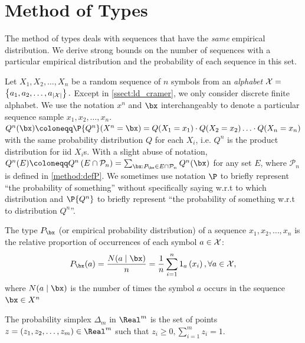 \documentclass{article}
\newcommand{\typss}{\mathcal{P}_n}
\begin{document}
\section{Method of Types}\label{sec:method}
The method of types  deals with sequences that have the \emph{same} empirical distribution.  We derive strong bounds on the number of sequences with a particular empirical distribution and the probability of each sequence in this set. 


Let $X_{1}, X_{2}, \ldots, X_{n}$ be a random sequence of $n$ symbols from an \emph{alphabet} $\cal{X} =$ $\left\{a_{1}, a_{2}, \ldots, a_{|\cal{X}|}\right\} .$ Except in \cref{ssect:ld_cramer}, we only consider discrete finite alphabet. We use the notation $x^{n}$ and $\bx$ interchangeably to denote a particular sequence sample $x_{1}, x_{2}, \ldots, x_{n}$. $Q^n(\bx) \coloneqq \P{Q^n}(X^n = \bx) = Q(X_1 = x_1)\cdot Q(X_2 = x_2)\ldots \cdot Q(X_n = x_n)$ with the same probability distribution $Q$ for each $X_i$, i.e. $Q^n$ is the product distribution for \gls{iid} $X_i$s. With a slight abuse of notation, $Q^{n}(E)\coloneqq Q^{n}\left(E \cap \typss\right)=\sum_{ \bx : P_{ \bx } \in E \cap \typss} Q^{n}( \bx )$ for any set $E$, where $\typss$ is defined in \cref{method:defP}. We sometimes use notation $\P$ to briefly represent  ``the probability of something'' without specifically saying w.r.t to which distribution and $\P{Q^n}$ to  briefly represent ``the probability of something w.r.t to distribution ${Q^n}$''.


\begin{defa}{}
The type $P_{ \bx }$ (or empirical probability distribution) of a sequence $x_{1}, x_{2}, \ldots, x_{n}$ is the relative proportion of occurrences of each symbol $a\in \cal{X}$:
\begin{align*}
    P_{\bx }(a)= \frac{N(a \mid \bx )}{n} = \frac{1}{n} \sum_{i=1}^{n} 1_{a}\left(x_{i}\right), \forall a \in \cal{X},
\end{align*}
where $N(a \mid \bx )$ is the number of times the symbol $a$ occurs in the sequence $\bx \in X ^{n}$
\end{defa}

\begin{defa}{}
The probability simplex $\Delta_m$ in $\Real ^{m}$ is the set of points $z=\left(z_{1}, z_{2}, \ldots, z_{m}\right) \in \Real ^{m}$ such that $z_{i} \geq 0, \sum_{i=1}^{m} z_{i}=1$.
\end{defa}
\end{document}
